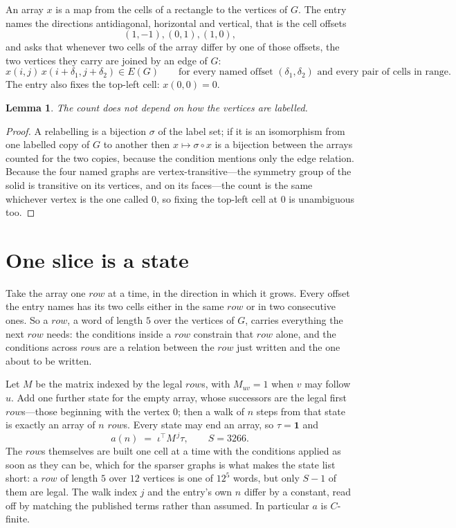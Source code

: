 \documentclass[11pt,a4paper]{article}
\theoremstyle{plain}
\newtheorem{lemma}[theorem]{Lemma}
\theoremstyle{definition}
\begin{document}
An array $x$ is a map from the cells of a rectangle to the vertices of $G$. The entry names the
directions antidiagonal, horizontal and vertical, that is the cell offsets
\[
(1,-1), (0,1), (1,0),
\]
and asks that whenever two cells of the array differ by one of those offsets, the two vertices
they carry are joined by an edge of $G$:
\[
x(i,j)\,x(i+\delta_1,j+\delta_2)\in E(G)\qquad
\text{for every named offset } (\delta_1,\delta_2)\text{ and every pair of cells in range.}
\]
The entry also fixes the top-left cell: $x(0,0)=0$.

\begin{lemma}\label{lem:label}
The count does not depend on how the vertices are labelled.
\end{lemma}

\begin{proof}
A relabelling is a bijection $\sigma$ of the label set; if it is an isomorphism from one
labelled copy of $G$ to another then $x\mapsto\sigma\circ x$ is a bijection between the arrays
counted for the two copies, because the condition mentions only the edge relation.
Because the four named graphs are vertex-transitive---the symmetry group of the solid is transitive on its vertices, and on its faces---the count is the same whichever vertex is the one called $0$, so fixing the top-left cell at $0$ is unambiguous too.
\end{proof}

\section{One slice is a state}

Take the array one $row$ at a time, in the direction in which it grows.
Every offset the entry names has its two cells either in the same $row$ or in two
consecutive ones. So a $row$, a word of length $5$ over the vertices of $G$, carries
everything the next $row$ needs: the conditions inside a $row$ constrain that
$row$ alone, and the conditions across $row$s are a relation between the
$row$ just written and the one about to be written.

Let $M$ be the matrix indexed by the legal $row$s, with $M_{uv}=1$ when $v$ may
follow $u$. Add one further state for the empty array, whose successors are the legal first
$row$s---those beginning with the vertex $0$; then a walk of
$n$ steps from that state is exactly an array of $n$ $row$s. Every state may end an
array, so $\tau=\mathbf{1}$ and
\[
a(n)\;=\;\iota^{\!\top}M^{\,j}\tau ,\qquad S=3266.
\]
The $row$s themselves are built one cell at a time with the conditions applied as soon
as they can be, which for the sparser graphs is what makes the state list short: a $row$
of length $5$ over $12$ vertices is one of $12^{5}$ words, but only $S-1$ of them are
legal. The walk index $j$ and the entry's own $n$ differ by a constant, read off by matching the
published terms rather than assumed. In particular $a$ is $C$-finite.
\end{document}
